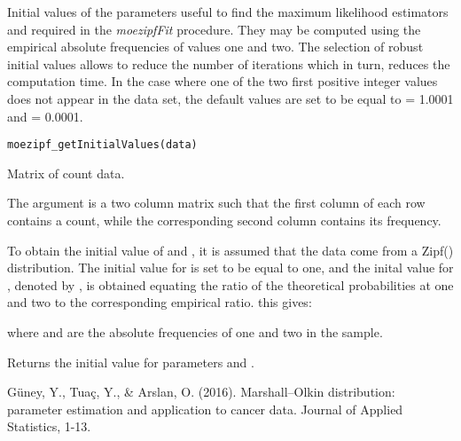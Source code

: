 \documentclass[letterpaper]{book}
\begin{document}
%
\begin{Description}\relax
Initial values of the parameters useful to find the maximum likelihood estimators and required
in the \emph{moezipfFit} procedure. They may be computed using the empirical absolute frequencies
of values one and two. The selection of robust initial values allows to reduce the number
of iterations which in turn, reduces the computation time.
In the case where one of the two first positive integer values does not appear in the data
set, the default values are set to be equal to \eqn{\alpha}{} = 1.0001 and \eqn{\beta}{} = 0.0001.
\end{Description}
%
\begin{Usage}
\begin{verbatim}
moezipf_getInitialValues(data)
\end{verbatim}
\end{Usage}
%
\begin{Arguments}
\begin{ldescription}
\item[\code{data}] Matrix of count data.
\end{ldescription}
\end{Arguments}
%
\begin{Details}\relax
The argument  is a two column matrix such that the first column of each row contains a
count, while the corresponding second column contains its frequency.

To obtain the initial value of \eqn{\alpha}{} and \eqn{\beta}{}, it is assumed that
the data come from a Zipf(\eqn{\alpha}{}) distribution. The initial value for \eqn{\beta}{}
is set to be equal to one, and the inital value for \eqn{\alpha}{}, denoted by , is obtained
equating the ratio of the theoretical probabilities at one and two to the corresponding empirical
ratio. this gives:

where  and  are the absolute frequencies of one and two in the sample.
\end{Details}
%
\begin{Value}
Returns the initial value for parameters \eqn{\alpha}{} and \eqn{\beta}{}.
\end{Value}
%
\begin{References}\relax
 Güney, Y., Tuaç, Y., \& Arslan, O. (2016). Marshall–Olkin distribution: parameter estimation and
application to cancer data. Journal of Applied Statistics, 1-13.
\end{References}
\end{document}
